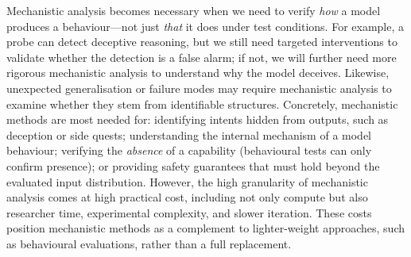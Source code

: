 Mechanistic analysis becomes necessary when we need to verify \textit{how} a model produces a behaviour---not just \textit{that} it does under test conditions. For example, a probe can detect deceptive reasoning, but we still need targeted interventions to validate whether the detection is a false alarm; if not, we will further need more rigorous mechanistic analysis to understand why the model deceives. Likewise, unexpected generalisation or failure modes may require mechanistic analysis to examine whether they stem from identifiable structures. Concretely, mechanistic methods are most needed for: identifying intents hidden from outputs, such as deception or side quests; understanding the internal mechanism of a model behaviour; verifying the \textit{absence} of a capability (behavioural tests can only confirm presence); or providing safety guarantees that must hold beyond the evaluated input distribution. However, the high granularity of mechanistic analysis comes at high practical cost, including not only compute but also researcher time, experimental complexity, and slower iteration. These costs position mechanistic methods as a complement to lighter-weight approaches, such as behavioural evaluations, rather than a full replacement.


